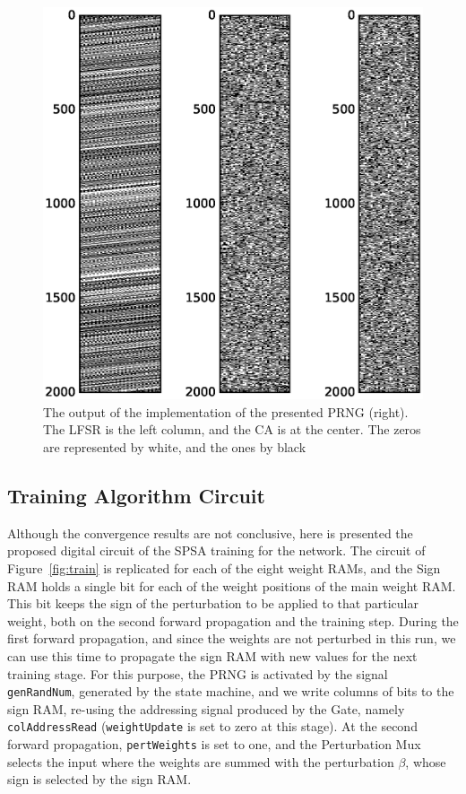 \begin{figure}
    \centering
    \includegraphics[width=\linewidth]{figures/prng_out.eps}
    \caption[The output of the implementation of the presented PRNG (right). The LFSR is the left column, and the CA is at the center]{The output of the implementation of the presented PRNG (right). The LFSR is the left column, and the CA is at the center. The zeros are represented by white, and the ones by black}
    \label{fig:prng_out}
\end{figure}


 
\subsection{Training Algorithm Circuit}\label{sec:train-circ}
Although the convergence results are not conclusive, here is presented the proposed digital circuit of the SPSA training for the network. The circuit of Figure~\ref{fig:train} is replicated for each of the eight weight RAMs, and the Sign RAM holds a single bit for each of the weight positions of the main weight RAM. This bit keeps the sign of the perturbation to be applied to that particular weight, both on the second forward propagation and the training step. During the first forward propagation, and since the weights are not perturbed in this run, we can use this time to propagate the sign RAM with new values for the next training stage. For this purpose, the PRNG is activated by the signal \verb+genRandNum+, generated by the state machine, and we write columns of bits to the sign RAM, re-using the addressing signal produced by the Gate, namely \verb+colAddressRead+ (\verb+weightUpdate+ is set to zero at this stage).
At the second forward propagation, \verb+pertWeights+ is set to one, and the Perturbation Mux selects the input where the weights are summed with the perturbation $\beta$, whose sign is selected by the sign RAM.

